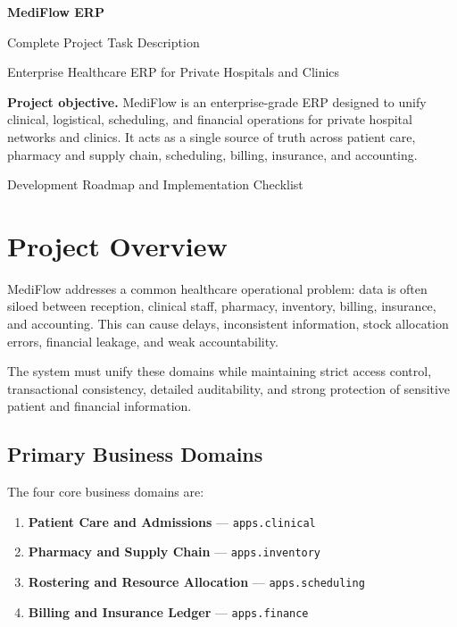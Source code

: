 \documentclass[11pt,a4paper]{article}
\begin{document}
\begin{titlepage}
    \centering
    \vspace*{2cm}
    {\Huge\bfseries MediFlow ERP\par}
    \vspace{0.5cm}
    {\LARGE Complete Project Task Description\par}
    \vspace{1.5cm}
    {\large Enterprise Healthcare ERP for Private Hospitals and Clinics\par}
    \vfill

    \begin{minipage}{0.9\textwidth}
    \textbf{Project objective.}
    MediFlow is an enterprise-grade ERP designed to unify clinical,
    logistical, scheduling, and financial operations for private hospital
    networks and clinics. It acts as a single source of truth across
    patient care, pharmacy and supply chain, scheduling, billing,
    insurance, and accounting.
    \end{minipage}

    \vfill
    {\large Development Roadmap and Implementation Checklist\par}
\end{titlepage}

\tableofcontents
\newpage

\section{Project Overview}

MediFlow addresses a common healthcare operational problem: data is often
siloed between reception, clinical staff, pharmacy, inventory, billing,
insurance, and accounting. This can cause delays, inconsistent information,
stock allocation errors, financial leakage, and weak accountability.

The system must unify these domains while maintaining strict access control,
transactional consistency, detailed auditability, and strong protection of
sensitive patient and financial information.

\subsection{Primary Business Domains}

The four core business domains are:

\begin{enumerate}
    \item \textbf{Patient Care and Admissions} --- \texttt{apps.clinical}
    \item \textbf{Pharmacy and Supply Chain} --- \texttt{apps.inventory}
    \item \textbf{Rostering and Resource Allocation} --- \texttt{apps.scheduling}
    \item \textbf{Billing and Insurance Ledger} --- \texttt{apps.finance}
\end{enumerate}
\end{document}
